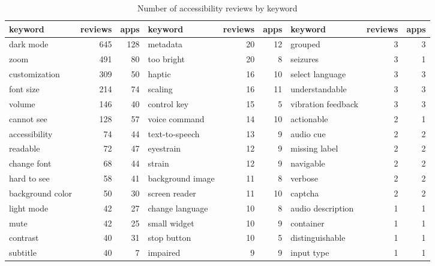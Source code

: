 \begin{table}[!htb]
\centering
\caption{Number of accessibility reviews by keyword}
\label{tab:keywords-reviews}
\begin{tabular}{lrr||lrr||lrr}
\hline
keyword          & reviews & apps & keyword          & reviews & apps & keyword            & reviews & apps \\
\hline
dark mode        & 645     & 128  & metadata         & 20      & 12   & grouped            & 3       & 3    \\
zoom             & 491     & 80   & too bright       & 20      & 8    & seizures           & 3       & 1    \\
customization    & 309     & 50   & haptic           & 16      & 10   & select language    & 3       & 3    \\
font size        & 214     & 74   & scaling          & 16      & 11   & understandable     & 3       & 3    \\
volume           & 146     & 40   & control key      & 15      & 5    & vibration feedback & 3       & 3    \\
cannot see       & 128     & 57   & voice command    & 14      & 10   & actionable         & 2       & 1    \\
accessibility    & 74      & 44   & text-to-speech   & 13      & 9    & audio cue          & 2       & 2    \\
readable         & 72      & 47   & eyestrain        & 12      & 9    & missing label      & 2       & 2    \\
change font      & 68      & 44   & strain           & 12      & 9    & navigable          & 2       & 2    \\
hard to see      & 58      & 41   & background image & 11      & 8    & verbose            & 2       & 2    \\
background color & 50      & 30   & screen reader    & 11      & 10   & captcha            & 2       & 2    \\
light mode       & 42      & 27   & change language  & 10      & 8    & audio description  & 1       & 1    \\
mute             & 42      & 25   & small widget     & 10      & 9    & container          & 1       & 1    \\
contrast         & 40      & 31   & stop button      & 10      & 5    & distinguishable    & 1       & 1    \\
subtitle         & 40      & 7    & impaired         & 9       & 9    & input type         & 1       & 1    \\

\end{tabular}
\end{table}
